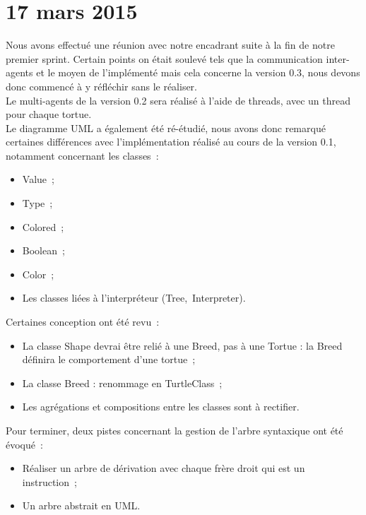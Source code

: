 \section{17 mars 2015}

Nous avons effectué une réunion avec notre encadrant suite à la fin de notre premier sprint. Certain points on était soulevé tels que la communication inter-agents et le moyen de l'implémenté mais cela concerne la version 0.3, nous devons donc commencé à y réfléchir sans le réaliser.
\\
Le multi-agents de la version 0.2 sera réalisé à l'aide de threads, avec un thread pour chaque tortue.
\\
Le diagramme UML a également été ré-étudié, nous avons donc remarqué certaines différences avec l'implémentation réalisé au cours de la version 0.1, notamment concernant les classes~:
\begin{itemize}
\item Value~;
\item Type~;
\item Colored~;
\item Boolean~;
\item Color~;
\item Les classes liées à l'interpréteur (Tree,~Interpreter).
\end{itemize}


Certaines conception ont été revu~:
\begin{itemize}
\item La classe Shape devrai être relié à une Breed, pas à une Tortue : la Breed définira le comportement d'une tortue~;
\item La classe Breed : renommage en TurtleClass~;
\item Les agrégations et compositions entre les classes sont à rectifier.
\end{itemize}


Pour terminer, deux pistes concernant la gestion de l'arbre syntaxique ont été évoqué~:
\begin{itemize}
\item Réaliser un arbre de dérivation avec chaque frère droit qui est un instruction~;
\item Un arbre abstrait en UML.
\end{itemize}
